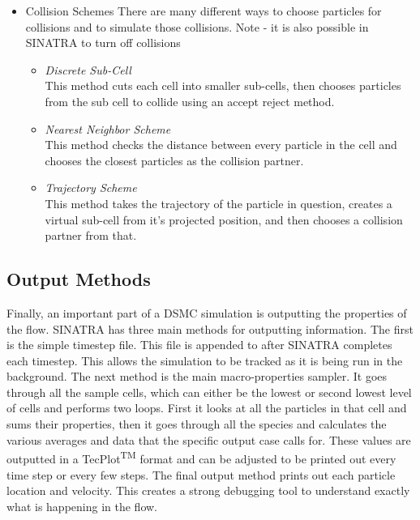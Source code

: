 \begin{itemize}
    
    \item Collision Schemes
    There are many different ways to choose particles for collisions and to simulate those collisions. Note - it is also possible in SINATRA to turn off collisions
    \begin{itemize}
        \item \textit{Discrete Sub-Cell}\\
        This method cuts each cell into smaller sub-cells, then chooses particles from the sub cell to collide using an accept reject method. 
        \item \textit{Nearest Neighbor Scheme}\\
        This method checks the distance between every particle in the cell and chooses the closest particles as the collision partner.
        \item \textit{Trajectory Scheme}\\
        This method takes the trajectory of the particle in question, creates a virtual sub-cell from it's projected position, and then chooses a collision partner from that. 
    \end{itemize}
\end{itemize}


\subsection{Output Methods}
\label{sec:output}

Finally, an important part of a DSMC simulation is outputting the properties of the flow. SINATRA has three main methods for outputting information. The first is the simple timestep file. This file is appended to after SINATRA completes each timestep. This allows the simulation to be tracked as it is being run in the background. The next method is the main macro-properties sampler. It goes through all the sample cells, which can either be the lowest or second lowest level of cells and performs two loops. First it looks at all the particles in that cell and sums their properties, then it goes through all the species and calculates the various averages and data that the specific output case calls for. These values are outputted in a TecPlot\textsuperscript{TM} format and can be adjusted to be printed out every time step or every few steps. The final output method prints out each particle location and velocity. This creates a strong debugging tool to understand exactly what is happening in the flow. 